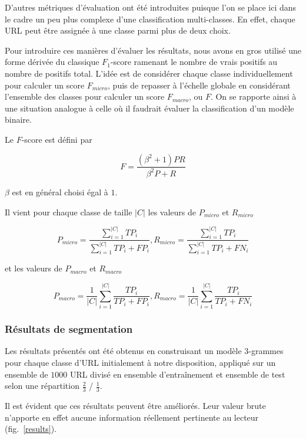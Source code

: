 \documentclass[11pt, a4paper]{article}
\begin{document}
D'autres métriques d'évaluation ont été introduites puisque l'on se place ici dans le cadre un peu plus complexe d'une classification multi-classes. En effet, chaque URL peut être assignée à une classe parmi plus de deux choix. 

Pour introduire ces manières d'évaluer les résultats, nous avons en gros utilisé une forme dérivée du classique $F_1$-score ramenant le nombre de vrais positifs au nombre de positifs total. L'idée est de considérer chaque classe individuellement pour calculer un score $F_{micro}$, puis de repasser à l'échelle globale en considérant l'ensemble des classes pour calculer un score $F_{macro}$, ou $F$. On se rapporte ainsi à une situation analogue à celle où il faudrait évaluer la classification d'un modèle binaire.

Le $F$-score est défini par

\[
F = \frac{(\beta^2 + 1)PR}{\beta^2P+R}
\]

$\beta$ est en général choisi égal à $1$.

Il vient pour chaque classe de taille $|C|$ les valeurs de $P_{micro}$ et $R_{micro}$

\[
P_{micro} = \frac{\sum_{i=1}^{|C|}TP_i}{\sum_{i=1}^{|C|}TP_i+FP_i}, R_{micro} = \frac{\sum_{i=1}^{|C|}TP_i}{\sum_{i=1}^{|C|}TP_i+FN_i}
\]

et les valeurs de $P_{macro}$ et $R_{macro}$

\[
P_{macro} = \frac{1}{|C|}\sum_{i=1}^{|C|}\frac{TP_i}{TP_i+FP_i}, R_{macro} = \frac{1}{|C|}\sum_{i=1}^{|C|}\frac{TP_i}{TP_i+FN_i}
\]

\subsubsection{Résultats de segmentation}

Les résultats présentés ont été obtenus en construisant un modèle $3$-grammes pour chaque classe d'URL initialement à notre disposition, appliqué sur un ensemble de $1000$ URL divisé en ensemble d'entraînement et ensemble de test selon une répartition $\frac{2}{3}$ / $\frac{1}{3}$.

Il est évident que ces résultats peuvent être améliorés. Leur valeur brute n'apporte en effet aucune information réellement pertinente au lecteur (fig.~\ref{results}).
\end{document}
